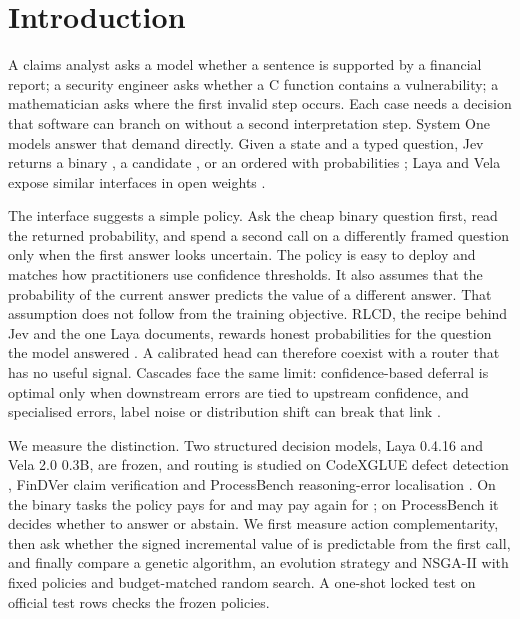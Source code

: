 \section{Introduction}

A claims analyst asks a model whether a sentence is supported by a financial
report; a security engineer asks whether a C function contains a vulnerability;
a mathematician asks where the first invalid step occurs. Each case needs a
decision that software can branch on without a second interpretation step.
System One models answer that demand directly. Given a state and a typed
question, Jev returns a binary \noul{}, a candidate \choice{}, or an ordered
\score{} with probabilities \citep{typesafe2026,deusser2026jev}; Laya and Vela
expose similar interfaces in open weights \citep{laya2026,vllm2026vela}.

The interface suggests a simple policy. Ask the cheap binary question first,
read the returned probability, and spend a second call on a differently framed
\choice{} question only when the first answer looks uncertain. The policy is
easy to deploy and matches how practitioners use confidence thresholds. It also
assumes that the probability of the current answer predicts the value of a
different answer. That assumption does not follow from the training objective.
RLCD, the recipe behind Jev and the one Laya documents, rewards honest
probabilities for the question the model answered
\citep{typesafe2026,laya2026,gneiting2007scoring}. A calibrated head can
therefore coexist with a router that has no useful signal. Cascades face the
same limit: confidence-based deferral is optimal only when downstream errors
are tied to upstream confidence, and specialised errors, label noise or
distribution shift can break that link \citep{jitkrittum2023cascade}.

We measure the distinction. Two structured decision
models, Laya 0.4.16 and Vela 2.0 0.3B, are frozen, and routing is studied on
CodeXGLUE defect detection \citep{lu2021codexglue}, FinDVer claim verification
\citep{zhao2024findver} and ProcessBench reasoning-error localisation
\citep{zheng2025processbench}. On the binary tasks the policy pays for \noul{}
and may pay again for \choice{}; on ProcessBench it decides whether to answer or
abstain. We first measure action complementarity, then ask whether the signed
incremental value of \choice{} is predictable from the first call, and finally
compare a genetic algorithm, an evolution strategy and NSGA-II with fixed
policies and budget-matched random search. A one-shot locked test on official
test rows checks the frozen policies.

